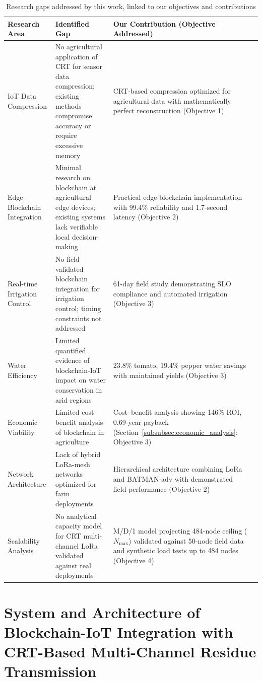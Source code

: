 \documentclass[pdflatex,sn-mathphys-num]{sn-jnl}
\theoremstyle{thmstyleone}
\theoremstyle{thmstyletwo}
\theoremstyle{thmstylethree}
\begin{document}
\begin{table}[htbp]
\centering
\caption{Research gaps addressed by this work, linked to our objectives and contributions}
\label{tab:research_gaps}
\footnotesize
\begin{tabularx}{\textwidth}{@{}p{}X p{} p{}@{}}
\toprule
\textbf{Research Area} & \textbf{Identified Gap} & \textbf{Our Contribution (Objective Addressed)} \\
\midrule
IoT Data Compression & No agricultural application of CRT for sensor data compression; existing methods compromise accuracy or require excessive memory & CRT-based compression optimized for agricultural data with mathematically perfect reconstruction (Objective 1) \\
\hline
Edge-Blockchain Integration & Minimal research on blockchain at agricultural edge devices; existing systems lack verifiable local decision-making & Practical edge-blockchain implementation with 99.4\% reliability and 1.7-second latency (Objective 2) \\
\hline
Real-time Irrigation Control & No field-validated blockchain integration for irrigation control; timing constraints not addressed & 61-day field study demonstrating SLO compliance and automated irrigation (Objective 3) \\
\hline
Water Efficiency & Limited quantified evidence of blockchain-IoT impact on water conservation in arid regions & 23.8\% tomato, 19.4\% pepper water savings with maintained yields (Objective 3) \\
\hline
Economic Viability & Limited cost-benefit analysis of blockchain in agriculture & Cost--benefit analysis showing 146\% ROI, 0.69-year payback (Section~\ref{subsubsec:economic_analysis}; Objective 3) \\
\hline
Network Architecture & Lack of hybrid LoRa-mesh networks optimized for farm deployments & Hierarchical architecture combining LoRa and BATMAN-adv with demonstrated field performance (Objective 2) \\
\hline
Scalability Analysis & No analytical capacity model for CRT multi-channel LoRa validated against real deployments & M/D/1 model projecting 484-node ceiling ($N_{\max}$) validated against 50-node field data and synthetic load tests up to 484 nodes (Objective 4) \\
\bottomrule
\end{tabularx}
\end{table}

\section{System and Architecture of Blockchain-IoT Integration with CRT-Based Multi-Channel Residue Transmission}
\label{sec:system_design}
\end{document}
